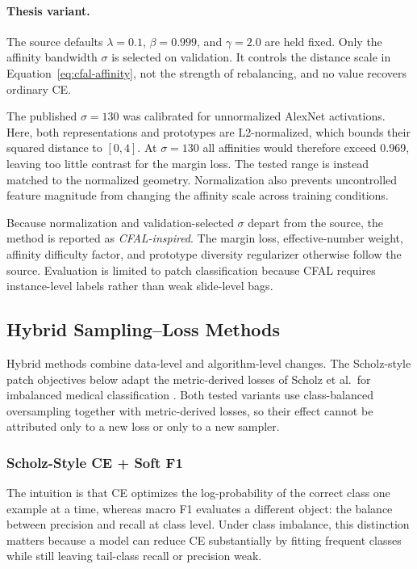 \documentclass[11pt]{article}
\begin{document}
\paragraph{Thesis variant.}
The source defaults $\lambda=\num{0.1}$, $\beta=\num{0.999}$, and $\gamma=\num{2.0}$ are held fixed. Only the affinity bandwidth $\sigma$ is selected on validation. It controls the distance scale in Equation~\eqref{eq:cfal-affinity}, not the strength of rebalancing, and no value recovers ordinary CE.

The published $\sigma=\num{130}$ was calibrated for unnormalized AlexNet activations. Here, both representations and prototypes are L2-normalized, which bounds their squared distance to $[0,4]$. At $\sigma=\num{130}$ all affinities would therefore exceed \num{0.969}, leaving too little contrast for the margin loss. The tested range is instead matched to the normalized geometry. Normalization also prevents uncontrolled feature magnitude from changing the affinity scale across training conditions.

Because normalization and validation-selected $\sigma$ depart from the source, the method is reported as \emph{CFAL-inspired}. The margin loss, effective-number weight, affinity difficulty factor, and prototype diversity regularizer otherwise follow the source. Evaluation is limited to patch classification because CFAL requires instance-level labels rather than weak slide-level bags.

\subsection{Hybrid Sampling--Loss Methods}
Hybrid methods combine data-level and algorithm-level changes. The Scholz-style patch objectives below adapt the metric-derived losses of Scholz et al.\ for imbalanced medical classification \citep{scholz2024imbalanceAware}. Both tested variants use class-balanced oversampling together with metric-derived losses, so their effect cannot be attributed only to a new loss or only to a new sampler.

\subsubsection{Scholz-Style CE + Soft F1}
The intuition is that CE optimizes the log-probability of the correct class one example at a time, whereas macro F1 evaluates a different object: the balance between precision and recall at class level. Under class imbalance, this distinction matters because a model can reduce CE substantially by fitting frequent classes while still leaving tail-class recall or precision weak.
\end{document}
